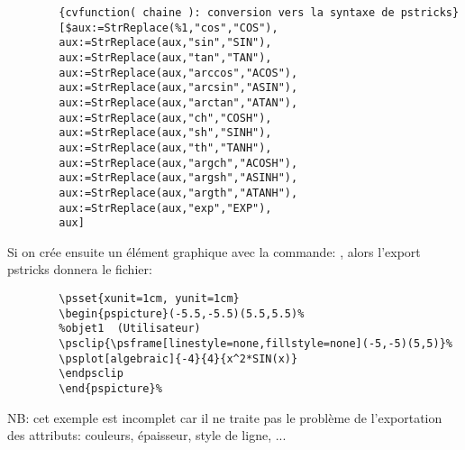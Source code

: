 \begin{itemize}
\bigskip

\begin{verbatim}
        {cvfunction( chaine ): conversion vers la syntaxe de pstricks}
        [$aux:=StrReplace(%1,"cos","COS"),
        aux:=StrReplace(aux,"sin","SIN"),
        aux:=StrReplace(aux,"tan","TAN"),
        aux:=StrReplace(aux,"arccos","ACOS"),
        aux:=StrReplace(aux,"arcsin","ASIN"),
        aux:=StrReplace(aux,"arctan","ATAN"),
        aux:=StrReplace(aux,"ch","COSH"),
        aux:=StrReplace(aux,"sh","SINH"),
        aux:=StrReplace(aux,"th","TANH"),
        aux:=StrReplace(aux,"argch","ACOSH"),
        aux:=StrReplace(aux,"argsh","ASINH"),
        aux:=StrReplace(aux,"argth","ATANH"),
        aux:=StrReplace(aux,"exp","EXP"),
        aux]
\end{verbatim}

\bigskip

Si on crée ensuite un élément graphique avec la commande: , alors l'export pstricks donnera le fichier:

\bigskip

\begin{verbatim}
        \psset{xunit=1cm, yunit=1cm}
        \begin{pspicture}(-5.5,-5.5)(5.5,5.5)%
        %objet1  (Utilisateur)
        \psclip{\psframe[linestyle=none,fillstyle=none](-5,-5)(5,5)}%
        \psplot[algebraic]{-4}{4}{x^2*SIN(x)}
        \endpsclip
        \end{pspicture}% 
\end{verbatim}

\bigskip

NB: cet exemple est incomplet car il ne traite pas le problème de l'exportation des attributs: couleurs, épaisseur, style de ligne, ...

\end{itemize}

